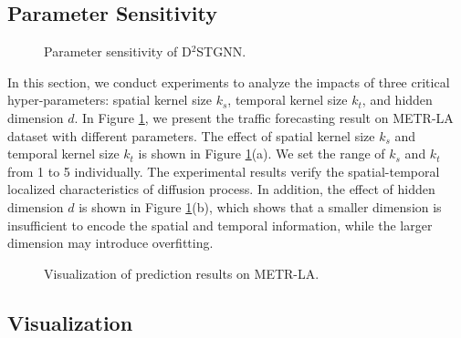 \documentclass[sigconf, nonacm]{acmart}
\begin{document}
 \subsection{Parameter Sensitivity}
\begin{figure}[h]
\centering
\setlength{\abovecaptionskip}{0.2cm}
\caption{Parameter sensitivity of D$^2$STGNN.}
\label{Parameter}
\end{figure}
In this section, we conduct experiments to analyze the impacts of three critical hyper-parameters: spatial kernel size $k_s$, temporal kernel size $k_t$, and hidden dimension $d$.
In Figure \ref{Parameter}, we present the traffic forecasting result on METR-LA dataset with different parameters.
The effect of spatial kernel size $k_s$ and temporal kernel size $k_t$ is shown in Figure \ref{Parameter}(a).
{\color{black}We set the range of $k_s$ and $k_t$ from 1 to 5 individually.}
The experimental results verify the {\color{black}spatial-temporal} localized characteristics of {\color{black}diffusion process}.
In addition, the effect of hidden dimension $d$ is shown in Figure \ref{Parameter}(b), {\color{black}which shows that} a smaller dimension is insufficient to encode the spatial and temporal information, while the larger dimension may introduce overfitting.
 \begin{figure}[h]
\centering 
\setlength{\abovecaptionskip}{0.2cm}
\caption{Visualization of prediction results on METR-LA.}
\label{Visualization}
\end{figure}

\subsection{Visualization}
\end{document}
